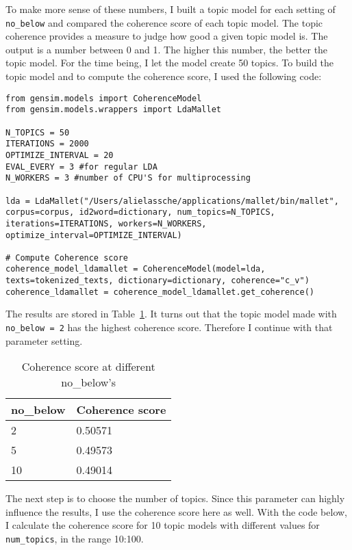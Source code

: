 To make more sense of these numbers, I built a topic model for each setting of \texttt{no\_below} and compared the coherence score of each topic model.  The topic coherence provides a measure to judge how good a given topic model is. The output is a number between 0 and 1. The higher this number, the better the topic model. For the time being, I let the model create 50 topics. To build the topic model and to compute the coherence score, I used the following code:

\begin{lstlisting}
from gensim.models import CoherenceModel
from gensim.models.wrappers import LdaMallet

N_TOPICS = 50
ITERATIONS = 2000
OPTIMIZE_INTERVAL = 20
EVAL_EVERY = 3 #for regular LDA
N_WORKERS = 3 #number of CPU'S for multiprocessing

lda = LdaMallet("/Users/alielassche/applications/mallet/bin/mallet", corpus=corpus, id2word=dictionary, num_topics=N_TOPICS, iterations=ITERATIONS, workers=N_WORKERS, optimize_interval=OPTIMIZE_INTERVAL)

# Compute Coherence score
coherence_model_ldamallet = CoherenceModel(model=lda, texts=tokenized_texts, dictionary=dictionary, coherence="c_v")
coherence_ldamallet = coherence_model_ldamallet.get_coherence()
\end{lstlisting}

\noindent The results are stored in Table~\ref{table:CSDiffNB}. It turns out that the topic model made with \texttt{no\_below = 2} has the highest coherence score. Therefore I continue with that parameter setting.

\begin{table}[]
	\centering
	\begin{tabular}{ll}
		\toprule
		no\_below & Coherence score  \\
		\midrule
		2 & 0.50571         \\
		5 & 0.49573     \\
		10 & 0.49014 \\
		\bottomrule      
	\end{tabular}
	\caption{Coherence score at different no\_below's}
	\label{table:CSDiffNB}
\end{table}

The next step is to choose the number of topics. Since this parameter can highly influence the results, I use the coherence score here as well. With the code below, I calculate the coherence score for 10 topic models with different values for \texttt{num\_topics}, in the range 10:100.

